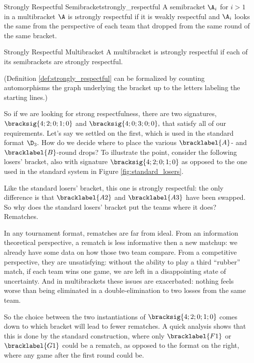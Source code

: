 {    \begin{definition}{Strongly Respectful Semibracket}{strongly_respectful}
        A semibracket $\A_i$ for $i > 1$ in a multibracket $\A$ is \i{strongly respectful} if it is weakly respectful and $\A_i$ looks the same from the perspective of each team that dropped from the same round of the same bracket.
    \end{definition}

    \begin{definition}{Strongly Respectful Multibracket}{}
        A multibracket is \i{strongly respectful} if each of its semibrackets are strongly respectful.
    \end{definition}

    (Definition \ref{def:strongly_respectful} can be formalized by counting automorphisms the graph underlying the bracket up to the letters labeling the starting lines.)

    So if we are looking for strong respectfulness, there are two signatures, $\bracksig{4;2;0;1;0}$ and $\bracksig{4;0;3;0;0},$ that satisfy all of our requirements. Let's say we settled on the first, which is used in the standard format $\D_3.$ How do we decide where to place the various $\bracklabel{A}$- and $\bracklabel{B}$-round drops? To illustrate the point, consider the following losers' bracket, also with signature $\bracksig{4;2;0;1;0}$ as opposed to the one used in the standard system in Figure \ref{fig:standard_losers}.


    Like the standard losers' bracket, this one is strongly respectful: the only difference is that $\bracklabel{A2}$ and $\bracklabel{A3}$ have been swapped. So why does the standard losers' bracket put the teams where it does? Rematches.

    In any tournament format, rematches are far from ideal. From an information theoretical perspective, a rematch is less informative then a new matchup: we already have some data on how those two team compare. From a competitive perspective, they are unsatisfying: without the ability to play a third ``rubber'' match, if each team wins one game, we are left in a disappointing state of uncertainty. And in multibrackets these issues are exacerbated: nothing feels worse than being eliminated in a double-elimination to two losses from the same team. 

    So the choice between the two instantiations of $\bracksig{4;2;0;1;0}$ comes down to which bracket will lead to fewer rematches. A quick analysis shows that this is done by the standard construction, where only $\bracklabel{F1}$ or $\bracklabel{G1}$ could be a rematch, as opposed to the format on the right, where any game after the first round could be.

}
